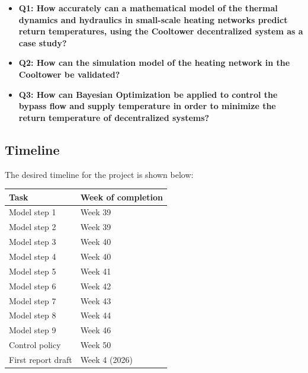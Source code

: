 \begin{itemize}
  \renewcommand\labelitemi{} %
    \item \textbf{Q1: How accurately can a mathematical model of the thermal dynamics and hydraulics in small-scale heating networks predict return temperatures, using the Cooltower decentralized system as a case study?}
    \item \textbf{Q2: How can the simulation model of the heating network in the Cooltower be validated?}
    \item \textbf{Q3: How can Bayesian Optimization be applied to control the bypass flow and supply temperature in order to minimize the return temperature of decentralized systems?}
\end{itemize}



\subsection{Timeline}
The desired timeline for the project is shown below:

\begin{table}[h]
\center
\begin{tabular}{l|l}
Task           & Week of completion \\ \hline
Model step 1   & Week 39\footnotemark[1]           \\
Model step 2   & Week 39\footnotemark[1]            \\
Model step 3   & Week 40            \\
Model step 4   & Week 40            \\
Model step 5   & Week 41            \\
Model step 6   & Week 42            \\
Model step 7   & Week 43            \\
Model step 8   & Week 44            \\
Model step 9   & Week 46            \\
Control policy & Week 50           \\
First report draft & Week 4 (2026)
\end{tabular}
\end{table}

